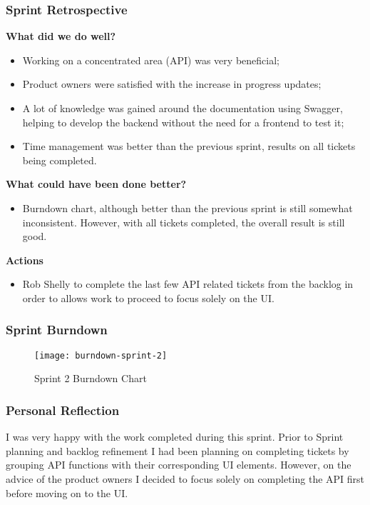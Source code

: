   \subsubsection{Sprint Retrospective}
  \textbf{What did we do well?}
  \begin{itemize}
    \item Working on a concentrated area (API) was very beneficial;
    \item Product owners were satisfied with the increase in progress updates;
    \item A lot of knowledge was gained around the documentation using Swagger,  helping to develop the backend without the need for a frontend to test it;
    \item Time management was better than the previous sprint, results on all tickets being completed.
  \end{itemize}
  
  \noindent\textbf{What could have been done better?}
  \begin{itemize}
    \item Burndown chart, although better than the previous sprint is still somewhat inconsistent. However, with all tickets completed, the overall result is still good.
  \end{itemize}
  
  \noindent\textbf{Actions}
  \begin{itemize}
    \item Rob Shelly to complete the last few API related tickets from the backlog in order to allows work to proceed to focus solely on the UI.
  \end{itemize}
  
  \subsubsection{Sprint Burndown}
  
  \begin{figure}[H]
    \setlength{\belowcaptionskip}{15pt plus 3pt minus 2pt}
    \caption{Sprint 2 Burndown Chart}
    \centering
    \texttt{[image: burndown-sprint-2]}
    \label{fig:burndown-sprint-2}
  \end{figure}
  
  \subsubsection{Personal Reflection}
  I was very happy with the work completed during this sprint. Prior to Sprint planning and backlog refinement I had been planning on completing tickets by grouping API functions with their corresponding UI elements. However, on the advice of the product owners I decided to focus solely on completing the API first before moving on to the UI.
  
